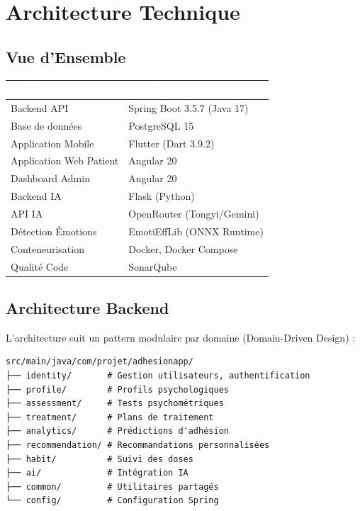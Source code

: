 \documentclass[12pt,a4paper]{report}
\begin{document}
\chapter{Architecture Technique}

\section{Vue d'Ensemble}

\begin{center}
\begin{tabularx}{\textwidth}{|l|X|}
    \hline
    \rowcolor{emsiblue}\textcolor{white}{\textbf{Composant}} & \textcolor{white}{\textbf{Technologie}} \\
    \hline
    Backend API & Spring Boot 3.5.7 (Java 17) \\
    \hline
    Base de données & PostgreSQL 15 \\
    \hline
    Application Mobile & Flutter (Dart 3.9.2) \\
    \hline
    Application Web Patient & Angular 20 \\
    \hline
    Dashboard Admin & Angular 20 \\
    \hline
    Backend IA & Flask (Python) \\
    \hline
    API IA & OpenRouter (Tongyi/Gemini) \\
    \hline
    Détection Émotions & EmotiEffLib (ONNX Runtime) \\
    \hline
    Conteneurisation & Docker, Docker Compose \\
    \hline
    Qualité Code & SonarQube \\
    \hline
\end{tabularx}
\end{center}

\section{Architecture Backend}

L'architecture suit un pattern modulaire par domaine (Domain-Driven Design) :

\begin{verbatim}
src/main/java/com/projet/adhesionapp/
├── identity/       # Gestion utilisateurs, authentification
├── profile/        # Profils psychologiques
├── assessment/     # Tests psychométriques
├── treatment/      # Plans de traitement
├── analytics/      # Prédictions d'adhésion
├── recommendation/ # Recommandations personnalisées
├── habit/          # Suivi des doses
├── ai/             # Intégration IA
├── common/         # Utilitaires partagés
└── config/         # Configuration Spring
\end{verbatim}
\end{document}
